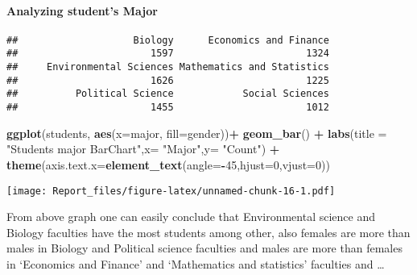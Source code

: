 \documentclass[
]{article}
\newenvironment{Shaded}{\begin{snugshade}}{\end{snugshade}}
\newcommand{\DataTypeTok}[1]{\textcolor[rgb]{0.13,0.29,0.53}{#1}}
\newcommand{\DecValTok}[1]{\textcolor[rgb]{0.00,0.00,0.81}{#1}}
\newcommand{\KeywordTok}[1]{\textcolor[rgb]{0.13,0.29,0.53}{\textbf{#1}}}
\newcommand{\NormalTok}[1]{#1}
\newcommand{\OperatorTok}[1]{\textcolor[rgb]{0.81,0.36,0.00}{\textbf{#1}}}
\newcommand{\StringTok}[1]{\textcolor[rgb]{0.31,0.60,0.02}{#1}}
\begin{document}
\hypertarget{analyzing-students-major}{%
\paragraph{Analyzing student's Major}\label{analyzing-students-major}}

\begin{Shaded}
\end{Shaded}

\begin{verbatim}
##                    Biology      Economics and Finance 
##                       1597                       1324 
##     Environmental Sciences Mathematics and Statistics 
##                       1626                       1225 
##          Political Science            Social Sciences 
##                       1455                       1012
\end{verbatim}

\begin{Shaded}
\begin{Highlighting}[]
\KeywordTok{ggplot}\NormalTok{(students, }\KeywordTok{aes}\NormalTok{(}\DataTypeTok{x=}\NormalTok{major, }\DataTypeTok{fill=}\NormalTok{gender))}\OperatorTok{+}
\StringTok{  }\KeywordTok{geom_bar}\NormalTok{() }\OperatorTok{+}\StringTok{ }
\StringTok{  }\KeywordTok{labs}\NormalTok{(}\DataTypeTok{title =} \StringTok{"Students major BarChart"}\NormalTok{,}\DataTypeTok{x=} \StringTok{"Major"}\NormalTok{,}\DataTypeTok{y=} \StringTok{"Count"}\NormalTok{) }\OperatorTok{+}
\StringTok{  }\KeywordTok{theme}\NormalTok{(}\DataTypeTok{axis.text.x=}\KeywordTok{element_text}\NormalTok{(}\DataTypeTok{angle=}\OperatorTok{-}\DecValTok{45}\NormalTok{,}\DataTypeTok{hjust=}\DecValTok{0}\NormalTok{,}\DataTypeTok{vjust=}\DecValTok{0}\NormalTok{))}
\end{Highlighting}
\end{Shaded}

\texttt{[image: Report\_files/figure-latex/unnamed-chunk-16-1.pdf]}

From above graph one can easily conclude that Environmental science and
Biology faculties have the most students among other, also females are
more than males in Biology and Political science faculties and males are
more than females in `Economics and Finance' and `Mathematics and
statistics' faculties and \ldots{}
\end{document}
